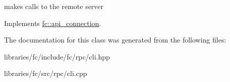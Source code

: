 makes calls to the remote server 

Implements \mbox{\hyperlink{classfc_1_1api__connection_a38d046b1803e1242ce10f36c694b9dea}{fc\+::api\+\_\+connection}}.



The documentation for this class was generated from the following files\+:\begin{DoxyCompactItemize}
\item 
libraries/fc/include/fc/rpc/cli.\+hpp\item 
libraries/fc/src/rpc/cli.\+cpp\end{DoxyCompactItemize}
